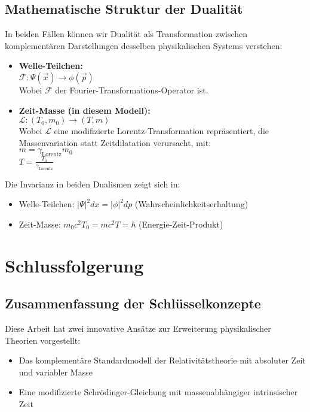 \documentclass[a4paper,12pt]{article}
\newcommand{\Tzero}{T_0}
\newcommand{\vecx}{\vec{x}}
\newcommand{\gammaf}{\gamma_{\text{Lorentz}}}
\begin{document}
	\subsection{Mathematische Struktur der Dualität}
	In beiden Fällen können wir Dualität als Transformation zwischen komplementären Darstellungen desselben physikalischen Systems verstehen:
	\begin{itemize}
		\item \textbf{Welle-Teilchen:} \\
		$\mathcal{F}: \Psi(\vecx) \rightarrow \phi(\vec{p})$ \\
		Wobei $\mathcal{F}$ der Fourier-Transformations-Operator ist.
		\item \textbf{Zeit-Masse (in diesem Modell):} \\
		$\mathcal{L}: (\Tzero, m_0) \rightarrow (T, m)$ \\
		Wobei $\mathcal{L}$ eine modifizierte Lorentz-Transformation repräsentiert, die Massenvariation statt Zeitdilatation verursacht, mit: \\
		$m = \gammaf m_0$ \\
		$T = \frac{\Tzero}{\gammaf}$
	\end{itemize}
	Die Invarianz in beiden Dualismen zeigt sich in:
	\begin{itemize}
		\item Welle-Teilchen: $|\Psi|^2 dx = |\phi|^2 dp$ (Wahrscheinlichkeitserhaltung)
		\item Zeit-Masse: $m_0c^2\Tzero = mc^2T = \hbar$ (Energie-Zeit-Produkt)
	\end{itemize}
	
	\section{Schlussfolgerung}
	
	\subsection{Zusammenfassung der Schlüsselkonzepte}
	Diese Arbeit hat zwei innovative Ansätze zur Erweiterung physikalischer Theorien vorgestellt:
	
	\begin{itemize}
		\item Das komplementäre Standardmodell der Relativitätstheorie mit absoluter Zeit und variabler Masse
		\item Eine modifizierte Schrödinger-Gleichung mit massenabhängiger intrinsischer Zeit
	\end{itemize}
	
\end{document}
